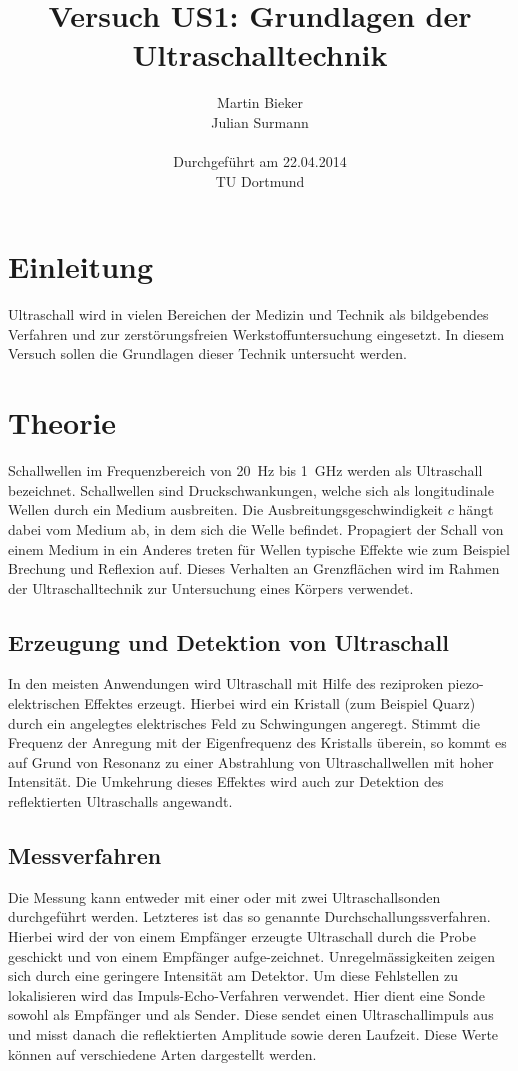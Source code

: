 \documentclass[11pt,ngerman,a4paper]{article}
\title{\textbf{Versuch US1: Grundlagen der Ultraschalltechnik}}
\author{Martin Bieker\\
		Julian Surmann\\
		\\
		Durchgef\"{u}hrt am 22.04.2014\\
		TU Dortmund}
\date{}
\begin{document}
\renewcommand\tablename{Tabelle}
\renewcommand\figurename{Abbildung}
\maketitle
\thispagestyle{empty}
\newpage
\clearpage
\setcounter{page}{1}


\section{Einleitung}
Ultraschall wird in vielen Bereichen der Medizin und Technik als bildgebendes Verfahren und zur zerst\"orungsfreien Werkstoffuntersuchung eingesetzt. In diesem Versuch sollen die Grundlagen dieser Technik untersucht werden.
\section{Theorie}

Schallwellen im Frequenzbereich von \SI{20}{\hertz} bis \SI{1}{\giga\hertz} werden als Ultraschall bezeichnet. Schallwellen sind Druckschwankungen, welche sich als longitudinale Wellen durch ein Medium ausbreiten. Die Ausbreitungsgeschwindigkeit $c$ h\"angt dabei vom Medium ab, in dem sich die Welle befindet. Propagiert der Schall von einem Medium in ein Anderes treten f\"ur Wellen typische Effekte wie zum Beispiel Brechung und Reflexion auf. Dieses Verhalten an Grenzfl\"achen wird im Rahmen der Ultraschalltechnik zur Untersuchung eines K\"orpers verwendet. 
\subsection{Erzeugung und Detektion von Ultraschall}
In den meisten Anwendungen wird Ultraschall mit Hilfe des reziproken piezo-elektrischen Effektes erzeugt. Hierbei wird ein Kristall (zum Beispiel Quarz) durch ein angelegtes elektrisches Feld zu Schwingungen angeregt. Stimmt die Frequenz der Anregung mit der Eigenfrequenz des Kristalls \"uberein, so kommt es auf Grund von Resonanz zu einer Abstrahlung von Ultraschallwellen mit hoher Intensit\"at.  Die Umkehrung dieses Effektes wird auch zur Detektion des reflektierten Ultraschalls angewandt.
\subsection{Messverfahren} 
Die Messung kann entweder mit einer oder mit zwei Ultraschallsonden durchgef\"uhrt werden. Letzteres ist das so genannte Durchschallungssverfahren. Hierbei wird der von einem Empf\"anger erzeugte Ultraschall durch die Probe geschickt und von einem Empf\"anger aufge-zeichnet. Unregelm\"assigkeiten zeigen sich durch eine geringere Intensit\"at am Detektor. Um diese Fehlstellen zu lokalisieren wird das Impuls-Echo-Verfahren verwendet. Hier dient eine Sonde sowohl als Empf\"anger und als Sender. Diese sendet einen Ultraschallimpuls aus und misst danach die reflektierten Amplitude sowie deren Laufzeit. Diese Werte k\"onnen auf verschiedene Arten dargestellt werden.
\end{document}
